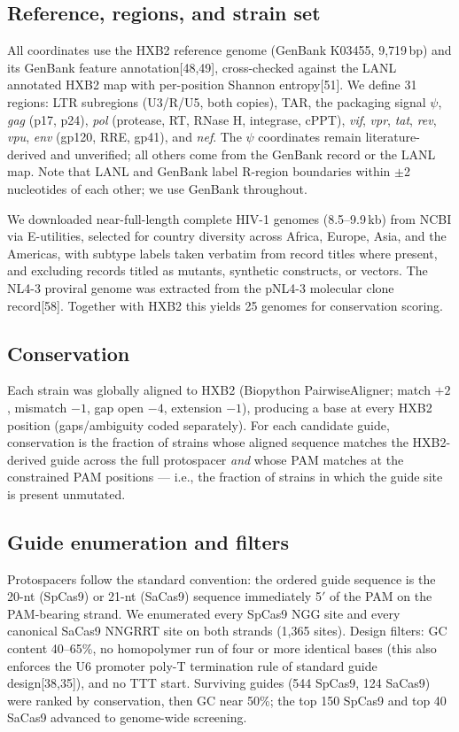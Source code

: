 \documentclass[11pt]{article}
\newcommand{\src}[1]{[#1]}
\newcommand{\HH}{HIV-1}
\begin{document}
\subsection{Reference, regions, and strain set}
All coordinates use the HXB2 reference genome (GenBank K03455, 9,719\,bp)
and its GenBank feature annotation\src{48,49}, cross-checked against the
LANL annotated HXB2 map with per-position Shannon entropy\src{51}. We
define 31 regions: LTR subregions (U3/R/U5, both copies), TAR, the
packaging signal $\psi$, \emph{gag} (p17, p24), \emph{pol} (protease, RT,
RNase H, integrase, cPPT), \emph{vif}, \emph{vpr}, \emph{tat}, \emph{rev},
\emph{vpu}, \emph{env} (gp120, RRE, gp41), and \emph{nef}. The $\psi$
coordinates remain literature-derived and unverified; all others come from
the GenBank record or the LANL map. Note that LANL and GenBank label R-region
boundaries within $\pm$2 nucleotides of each other; we use GenBank
throughout.

We downloaded \nstrains{} near-full-length complete \HH{} genomes (8.5--9.9\,kb)
from NCBI via E-utilities, selected for country diversity across Africa,
Europe, Asia, and the Americas, with subtype labels taken verbatim from
record titles where present, and excluding records titled as mutants,
synthetic constructs, or vectors. The NL4-3 proviral genome was extracted
from the pNL4-3 molecular clone record\src{58}. Together with HXB2 this
yields 25 genomes for conservation scoring.

\subsection{Conservation}
Each strain was globally aligned to HXB2 (Biopython PairwiseAligner; match
$+2$, mismatch $-1$, gap open $-4$, extension $-1$), producing a base at
every HXB2 position (gaps/ambiguity coded separately). For each candidate
guide, conservation is the fraction of strains whose aligned sequence
matches the HXB2-derived guide across the full protospacer \emph{and} whose
PAM matches at the constrained PAM positions --- i.e., the fraction of
strains in which the guide site is present unmutated.

\subsection{Guide enumeration and filters}
Protospacers follow the standard convention: the ordered guide sequence is
the 20-nt (SpCas9) or 21-nt (SaCas9) sequence immediately 5$'$ of the PAM on
the PAM-bearing strand. We enumerated every SpCas9 NGG site and every
canonical SaCas9 NNGRRT site on both strands (1,365 sites). Design filters:
GC content 40--65\%, no homopolymer run of four or more identical bases
(this also enforces the U6 promoter poly-T termination rule of standard
guide design\src{38,35}), and no TTT start. Surviving guides (544 SpCas9,
124 SaCas9) were ranked by conservation, then GC near 50\%; the top 150
SpCas9 and top 40 SaCas9 advanced to genome-wide screening.
\end{document}
